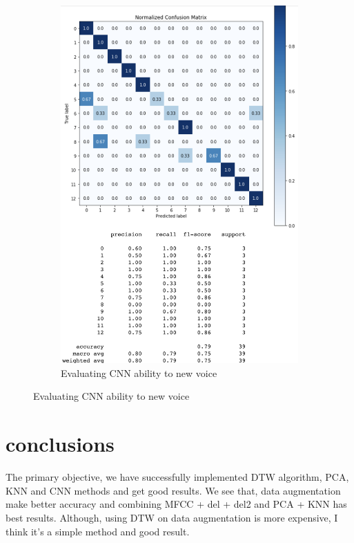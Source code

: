 \documentclass[%
  article,%
  10pt,%
  a4paper,%
  fleqn,%
  oneside,%
  sumario = tradicional,%
  chapter = TITLE,%
  section = TITLE,%
]{abntex2}
\begin{document}
\begin{figure}
\begin{minipage}[b]{.4\textwidth}
\begin{figure}[H]
  \includegraphics[width = \columnwidth]{./Figuras/cnnown}
   \caption{Evaluating CNN ability to new voice}
   \label{fig:cnnown}
\end{figure}
\end{minipage}
\end{figure}

\section{conclusions}
The primary objective, we have successfully implemented DTW algorithm, PCA, KNN and CNN methods and get good results. We see that, data augmentation make better accuracy and combining MFCC + del + del2 and PCA + KNN has best results. Although, using DTW on data augmentation is more expensive, I think it's a simple method and good result.

\printbibliography%

\end{document}
